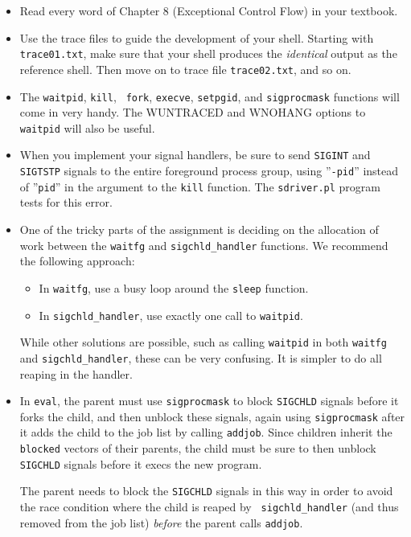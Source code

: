 \documentclass[11pt]{article}
\begin{document}
\begin{itemize}
\item Read every word of Chapter 8 (Exceptional Control Flow)
in your textbook.

\item Use the trace files to guide the development of your
shell. Starting with {\tt trace01.txt}, make sure that your shell
produces the {\em identical} output as the reference shell. Then move
on to trace file {\tt trace02.txt}, and so on.

\item The {\tt waitpid}, {\tt kill}, {\tt
fork}, {\tt execve}, {\tt setpgid}, and {\tt sigprocmask} functions
will come in very handy. The WUNTRACED and WNOHANG options to {\tt
waitpid} will also be useful.

\item When you implement your signal handlers, be sure to send
{\tt SIGINT} and {\tt SIGTSTP} signals to the entire foreground
process group, using ''{\tt -pid}'' instead of ''{\tt pid}'' in the
argument to the {\tt kill} function. The {\tt sdriver.pl} program tests
for this error.

\item One of the tricky parts of the assignment is deciding on the allocation
of work between the {\tt waitfg} and {\tt sigchld\_handler} functions.
We recommend the following approach:
\begin{itemize}
\item In {\tt waitfg}, use a busy loop around the {\tt sleep} function.  

\item In {\tt sigchld\_handler}, use exactly one call to {\tt waitpid}.  
\end{itemize}

While other solutions are possible, such as calling {\tt waitpid} in
both {\tt waitfg} and {\tt sigchld\_handler}, these can be very
confusing. It is simpler to do all reaping in the handler.

\item In {\tt eval}, the parent must use {\tt sigprocmask} to 
block {\tt SIGCHLD} signals before it forks the child, and then
unblock these signals, again using {\tt sigprocmask} after it adds the
child to the job list by calling {\tt addjob}. Since children inherit
the {\tt blocked} vectors of their parents, the child must be sure to
then unblock {\tt SIGCHLD} signals before it execs the new program.

The parent needs to block the {\tt SIGCHLD} signals in this way in
order to avoid the race condition where the child is reaped by {\tt
sigchld\_handler} (and thus removed from the job list) {\em before} the
parent calls {\tt addjob}.
 

\end{itemize}
\end{document}
